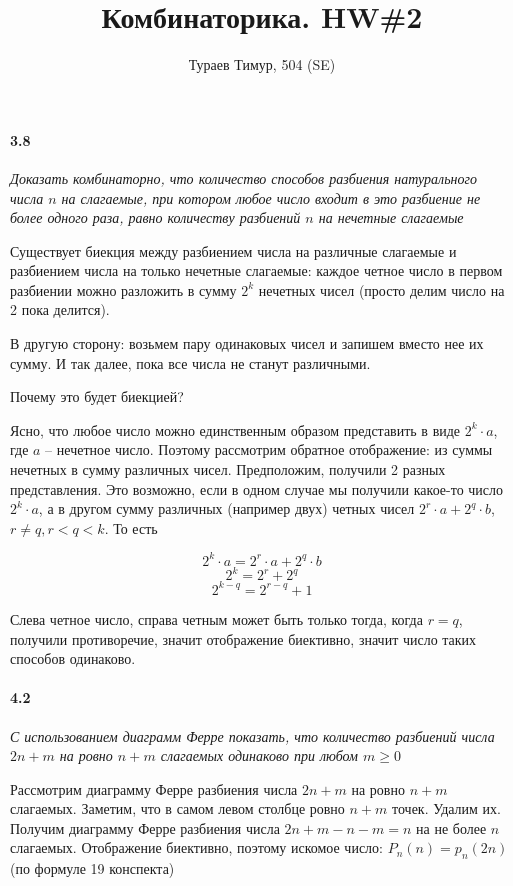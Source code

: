 \documentclass[russian]{article}
\begin{document}
\title{Комбинаторика. HW\#2}
\author{Тураев Тимур, 504 (SE)}
\maketitle

\paragraph*{3.8}

\textit{Доказать комбинаторно, что количество способов разбиения натурального числа $n$ на слагаемые, при котором любое число входит в это разбиение не более одного раза, равно количеству разбиений $n$ на нечетные слагаемые}


Существует биекция между разбиением числа на различные слагаемые и разбиением числа на только нечетные слагаемые: каждое четное число в первом разбиении можно разложить в сумму $2^k$ нечетных чисел (просто делим число на 2 пока делится).

В другую сторону: возьмем пару одинаковых чисел и запишем вместо нее их сумму. И так далее, пока все числа не станут различными. 

Почему это будет биекцией?

Ясно, что любое число можно единственным образом представить в виде $2^k \cdot a$, где $a$ -- нечетное число. Поэтому рассмотрим обратное отображение: из суммы нечетных в сумму различных чисел. Предположим, получили 2 разных представления. Это возможно, если в одном случае мы получили какое-то число $2^k \cdot a$, а в другом сумму различных (например двух) четных чисел $2^r \cdot a + 2^q \cdot b$, $r \neq q, r < q < k$. То есть

\[
2^k \cdot a= 2^r \cdot a + 2^q \cdot b
\]
\[
2^k = 2^r + 2^q
\]
\[
2^{k-q} = 2^{r-q} + 1
\]

Слева четное число, справа четным может быть только тогда, когда $r=q$, получили противоречие, значит отображение биективно, значит число таких способов одинаково.


\paragraph*{4.2}

\textit{С использованием диаграмм Ферре показать, что количество разбиений числа $2n+m$ на ровно $n+m$ слагаемых одинаково при любом $m \geqslant 0$}

Рассмотрим диаграмму Ферре разбиения числа $2n+m$ на ровно $n+m$ слагаемых. Заметим, что в самом левом столбце ровно $n+m$ точек. Удалим их. Получим диаграмму Ферре разбиения числа $2n+m - n - m = n$ на не более $n$ слагаемых. Отображение биективно, поэтому искомое число: $P_n(n) = p_n(2n)$ (по формуле 19 конспекта)
\end{document}
